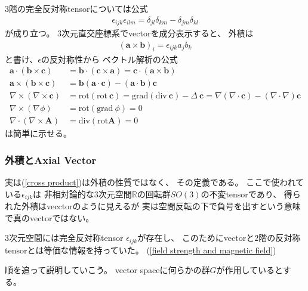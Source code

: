 $3$階の完全反対称tensorについては公式
\begin{align}
    \epsilon_{ijk}\epsilon_{ilm}
    =
    \delta_{jl}\delta_{km}
    -
    \delta_{jm}\delta_{kl}
\label{3rd order epsilon to delta2 formula}
\end{align}
が成り立つ。
$3$次元直交座標系でvectorを成分表示すると、
外積は
\begin{align}
    (\bm{a} \times \bm{b})_i
    =
    \epsilon_{ijk}
    a_j b_k
\label{cross product}
\end{align}
と書け、$\epsilon$の反対称性から
ベクトル解析の公式
\begin{subequations}
\begin{align}
    \bm{a} \cdot (\bm{b} \times \bm{c})
    &=
    \bm{b} \cdot (\bm{c} \times \bm{a})
    =
    \bm{c} \cdot (\bm{a} \times \bm{b})
\\
    \bm{a} \times (\bm{b} \times \bm{c})
    &=
    \bm{b} (\bm{a} \cdot \bm{c})
    -
    (\bm{a} \cdot \bm{b}) \bm{c}
\\
    \nabla \times (\nabla \times \bm{c})
    &=
    \mathrm{rot}(\mathrm{rot}\ \bm{c})
    =
    \mathrm{grad}(\mathrm{div}\ \bm{c})
    -
    \Delta\ \bm{c}
    =
    \nabla (\nabla \cdot \bm{c})
    -
    (\nabla \cdot \nabla) \bm{c}
\label{rot rot = grad div - laplacian}
\\
    \nabla \times (\nabla \phi)
    &=
    \mathrm{rot}(\mathrm{grad}\ \phi)
    = 0
\label{rot grad = 0}
\\
    \nabla \cdot (\nabla \times \bm{A})
    &=
    \mathrm{div}(\mathrm{rot}\bm{A})
    = 0
\label{div rot = 0}
\end{align}
\end{subequations}
は簡単に示せる。

\subsubsection{外積とAxial Vector}

実は(\ref{cross product})は外積の性質ではなく、
その定義である。
ここで使われている$\epsilon_{ijk}$は
非相対論的な$3$次元空間$\mathbb{R}$の回転群$SO(3)$の不変tensorであり、
得られた外積はvecctorのように見えるが
実は空間反転の下で負号を出すという意味で真のvectorではない。

$3$次元空間には完全反対称tensor $\epsilon_{ijk}$が存在し、
このためにvectorと$2$階の反対称tensorとは等価な情報を持っていた。
(\ref{field strength and magnetic field})


順を追って説明していこう。
vector spaceに何らかの群$G$が作用しているとする。

